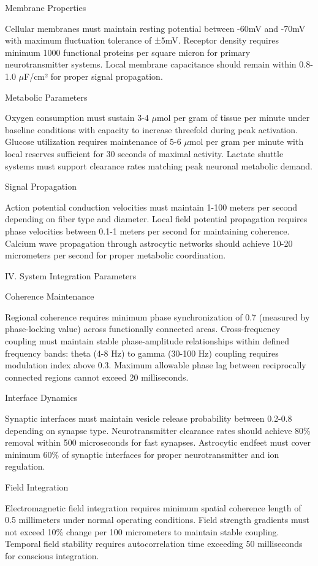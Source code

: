 \begin{refsection}
Membrane Properties

Cellular membranes must maintain resting potential between -60mV and -70mV with maximum fluctuation tolerance of ±5mV. Receptor density requires minimum 1000 functional proteins per square micron for primary neurotransmitter systems. Local membrane capacitance should remain within 0.8-1.0 $\mu$F/cm² for proper signal propagation.

Metabolic Parameters

Oxygen consumption must sustain 3-4 $\mu$mol per gram of tissue per minute under baseline conditions with capacity to increase threefold during peak activation. Glucose utilization requires maintenance of 5-6 $\mu$mol per gram per minute with local reserves sufficient for 30 seconds of maximal activity. Lactate shuttle systems must support clearance rates matching peak neuronal metabolic demand.

Signal Propagation

Action potential conduction velocities must maintain 1-100 meters per second depending on fiber type and diameter. Local field potential propagation requires phase velocities between 0.1-1 meters per second for maintaining coherence. Calcium wave propagation through astrocytic networks should achieve 10-20 micrometers per second for proper metabolic coordination.

IV. System Integration Parameters

Coherence Maintenance

Regional coherence requires minimum phase synchronization of 0.7 (measured by phase-locking value) across functionally connected areas. Cross-frequency coupling must maintain stable phase-amplitude relationships within defined frequency bands: theta (4-8 Hz) to gamma (30-100 Hz) coupling requires modulation index above 0.3. Maximum allowable phase lag between reciprocally connected regions cannot exceed 20 milliseconds.

Interface Dynamics

Synaptic interfaces must maintain vesicle release probability between 0.2-0.8 depending on synapse type. Neurotransmitter clearance rates should achieve 80\% removal within 500 microseconds for fast synapses. Astrocytic endfeet must cover minimum 60\% of synaptic interfaces for proper neurotransmitter and ion regulation.

Field Integration

Electromagnetic field integration requires minimum spatial coherence length of 0.5 millimeters under normal operating conditions. Field strength gradients must not exceed 10\% change per 100 micrometers to maintain stable coupling. Temporal field stability requires autocorrelation time exceeding 50 milliseconds for conscious integration.


\end{refsection}
